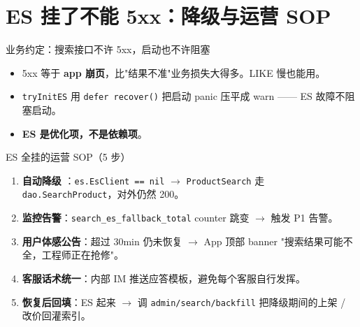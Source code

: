 \documentclass[aspectratio=169,11pt]{beamer}
\begin{document}
\section{ES 挂了不能 5xx：降级与运营 SOP}

\begin{frame}[shrink]{业务约定：搜索接口不许 5xx，启动也不许阻塞}
\vspace{1mm}
\begin{itemize}
  \item 5xx 等于 \textbf{app 崩页}，比"结果不准"业务损失大得多。LIKE 慢也能用。
  \item \texttt{tryInitES} 用 \texttt{defer recover()} 把启动 panic 压平成 warn —— ES 故障不阻塞启动。
  \item \textbf{ES 是优化项，不是依赖项}。
\end{itemize}
\end{frame}

\begin{frame}[shrink]{ES 全挂的运营 SOP（5 步）}
\begin{enumerate}
  \item \textbf{自动降级} ：\texttt{es.EsClient == nil} $\to$ \texttt{ProductSearch} 走 \texttt{dao.SearchProduct}，对外仍然 200。
  \item \textbf{监控告警}：\texttt{search\_es\_fallback\_total} counter 跳变 $\to$ 触发 P1 告警。
  \item \textbf{用户体感公告}：超过 30min 仍未恢复 $\to$ App 顶部 banner "搜索结果可能不全，工程师正在抢修"。
  \item \textbf{客服话术统一}：内部 IM 推送应答模板，避免每个客服自行发挥。
  \item \textbf{恢复后回填}：ES 起来 $\to$ 调 \texttt{admin/search/backfill} 把降级期间的上架 / 改价回灌索引。
\end{enumerate}
\vspace{2mm}
\end{frame}
\end{document}
